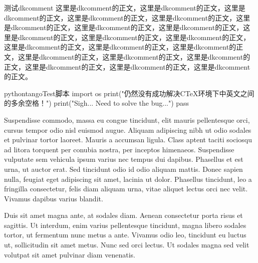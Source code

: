 \makelettertitle

\begin{cvletter}


\begin{dkcomment}{测试dkcomment}{\faTree}
这里是dkcomment的正文，这里是dkcomment的正文，这里是dkcomment的正文，这里是dkcomment的正文，这里是dkcomment的正文，这里是dkcomment的正文，这里是dkcomment的正文，这里是dkcomment的正文，这里是dkcomment的正文，这里是dkcomment的正文，这里是dkcomment的正文，这里是dkcomment的正文，这里是dkcomment的正文，这里是dkcomment的正文，这里是dkcomment的正文，这里是dkcomment的正文，这里是dkcomment的正文，这里是dkcomment的正文，这里是dkcomment的正文，这里是dkcomment的正文。
\end{dkcomment}

\begin{dkcodeh}{python}{tango}{Test脚本}
import os
print("仍然没有成功解决CTeX环境下中英文之间的多余空格！")
print("Sigh... Need to solve the bug...")
pass
\end{dkcodeh}


Suspendisse commodo, massa eu congue tincidunt, elit mauris pellentesque orci, cursus tempor odio nisl euismod augue. Aliquam adipiscing nibh ut odio sodales et pulvinar tortor laoreet. Mauris a accumsan ligula. Class aptent taciti sociosqu ad litora torquent per conubia nostra, per inceptos himenaeos. Suspendisse vulputate sem vehicula ipsum varius nec tempus dui dapibus. Phasellus et est urna, ut auctor erat. Sed tincidunt odio id odio aliquam mattis. Donec sapien nulla, feugiat eget adipiscing sit amet, lacinia ut dolor. Phasellus tincidunt, leo a fringilla consectetur, felis diam aliquam urna, vitae aliquet lectus orci nec velit. Vivamus dapibus varius blandit.

Duis sit amet magna ante, at sodales diam. Aenean consectetur porta risus et sagittis. Ut interdum, enim varius pellentesque tincidunt, magna libero sodales tortor, ut fermentum nunc metus a ante. Vivamus odio leo, tincidunt eu luctus ut, sollicitudin sit amet metus. Nunc sed orci lectus. Ut sodales magna sed velit volutpat sit amet pulvinar diam venenatis.

\end{cvletter}



\clearpage
